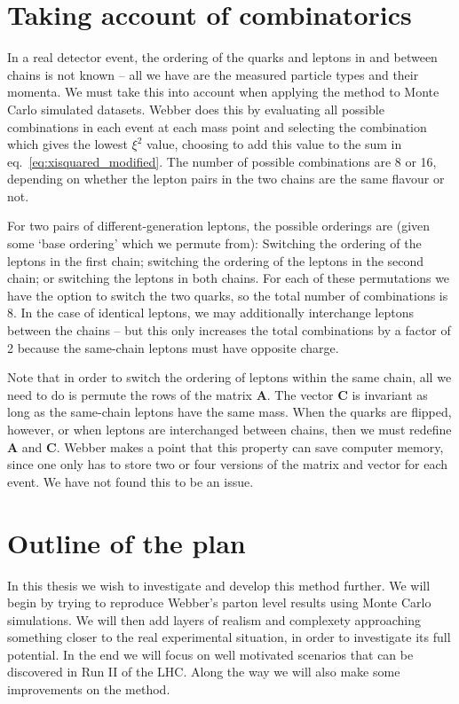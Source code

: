 \documentclass[twoside,english]{uiofysmaster}
\begin{document}
\section{Taking account of combinatorics}
\label{sec:combinatorics}
In a real detector event, the ordering of the quarks and leptons in and between chains is not known -- all we have are the measured particle types and their momenta. We must take this into account when applying the method to Monte Carlo simulated datasets. Webber does this by evaluating all possible combinations in each event at each mass point and selecting the combination which gives the lowest $\xi^2$ value, choosing to add this value to the sum in eq.\ \eqref{eq:xisquared_modified}. The number of possible combinations are 8 or 16, depending on whether the lepton pairs in the two chains are the same flavour or not. 

For two pairs of different-generation leptons, the possible orderings are (given some `base ordering' which we permute from): Switching the ordering of the leptons in the first chain; switching the ordering of the leptons in the second chain; or switching the leptons in both chains. For each of these permutations we have the option to switch the two quarks, so the total number of combinations is 8. In the case of identical leptons, we may additionally interchange leptons between the chains -- but this only increases the total combinations by a factor of 2 because the same-chain leptons must have opposite charge.

Note that in order to switch the ordering of leptons within the same chain, all we need to do is permute the rows of the matrix $\mathbf{A}$. The vector $\mathbf{C}$ is invariant as long as the same-chain leptons have the same mass. When the quarks are flipped, however, or when leptons are interchanged between chains, then we must redefine $\mathbf{A}$ and $\mathbf{C}$. Webber makes a point that this property can save computer memory, since one only has to store two or four versions of the matrix and vector for each event. We have not found this to be an issue.












\section{Outline of the plan}
In this thesis we wish to investigate and develop this method further. We will begin by trying to reproduce Webber's parton level results using Monte Carlo simulations. We will then add layers of realism and complexety approaching something closer to the real experimental situation, in order to investigate its full potential. In the end we will focus on well motivated scenarios that can be discovered in Run II of the LHC.  Along the way we will also make some improvements on the method.
\end{document}
